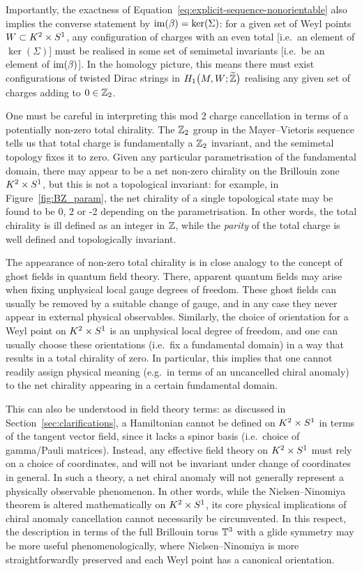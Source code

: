 Importantly, the exactness of Equation~\eqref{eq:explicit-sequence-nonorientable} also implies the converse statement by $\operatorname{im}(\beta) = \ker(\Sigma)$: for a given set of Weyl points $W\subset K^2\times S^1$, any configuration of charges with an even total [i.e.\ an element of $\ker(\Sigma)$] must be realised in some set of semimetal invariants [i.e.\ be an element of $\operatorname{im}(\beta)$]. In the homology picture, this means there must exist configurations of twisted Dirac strings in $H_1\big(M, W;\widetilde{\mathbb{Z}}\big)$ realising any given set of charges adding to $0\in\mathbb{Z}_2$.

One must be careful in interpreting this mod 2 charge cancellation in terms of a potentially non-zero total chirality. The $\mathbb{Z}_2$ group in the Mayer--Vietoris sequence tells us that total charge is fundamentally a $\mathbb{Z}_2$ invariant, and the semimetal topology fixes it to zero. Given any particular parametrisation of the fundamental domain, there may appear to be a net non-zero chirality on the Brillouin zone $K^2\times S^1$, but this is not a topological invariant: for example, in Figure~\ref{fig:BZ_param}, the net chirality of a single topological state may be found to be 0, 2 or -2 depending on the parametrisation. In other words, the total chirality is ill defined as an integer in $\mathbb{Z}$, while the \emph{parity} of the total charge is well defined and topologically invariant.

The appearance of non-zero total chirality is in close analogy to the concept of ghost fields in quantum field theory. There, apparent quantum fields may arise when fixing unphysical local gauge degrees of freedom. These ghost fields can usually be removed by a suitable change of gauge, and in any case they never appear in external physical observables. Similarly, the choice of orientation for a Weyl point on $K^2\times S^1$ is an unphysical local degree of freedom, and one can usually choose these orientations (i.e.\ fix a fundamental domain) in a way that results in a total chirality of zero. In particular, this implies that one cannot readily assign physical meaning (e.g.\ in terms of an uncancelled chiral anomaly) to the net chirality appearing in a certain fundamental domain.

This can also be understood in field theory terms: as discussed in Section~\ref{sec:clarifications}, a Hamiltonian cannot be defined on $K^2\times S^1$ in terms of the tangent vector field, since it lacks a spinor basis (i.e.\ choice of gamma/Pauli matrices). Instead, any effective field theory on $K^2\times S^1$ must rely on a choice of coordinates, and will not be invariant under change of coordinates in general. In such a theory, a net chiral anomaly will not generally represent a physically observable phenomenon. In other words, while the Nielsen--Ninomiya theorem is altered mathematically on $K^2\times S^1$, its core physical implications of chiral anomaly cancellation cannot necessarily be circumvented. In this respect, the description in terms of the full Brillouin torus $\mathbb{T}^3$ with a glide symmetry may be more useful phenomenologically, where Nielsen--Ninomiya is more straightforwardly preserved and each Weyl point has a canonical orientation.

